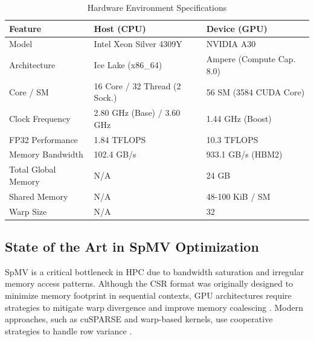 \documentclass[conference]{IEEEtran}
\begin{document}
\begin{table}[htbp]

\caption{Hardware Environment Specifications}

\label{tab:hardware}

\begin{center}

\footnotesize

\setlength{\tabcolsep}{3pt}

\begin{tabular}{|l|p{3.5cm}|p{3.5cm}|}

\hline

Feature & Host (CPU) & Device (GPU) \\

\hline

Model & Intel Xeon Silver 4309Y & NVIDIA A30 \\

Architecture & Ice Lake (x86\_64) & Ampere (Compute Cap. 8.0) \\

Core / SM & 16 Core / 32 Thread (2 Sock.) & 56 SM (3584 CUDA Core) \\

Clock Frequency & 2.80 GHz (Base) / 3.60 GHz & 1.44 GHz (Boost) \\

FP32 Performance & 1.84 TFLOPS & 10.3 TFLOPS \\

Memory Bandwidth & 102.4 GB/s & 933.1 GB/s (HBM2) \\

Total Global Memory & N/A & 24 GB \\

Shared Memory & N/A & 48-100 KiB / SM \\

Warp Size & N/A & 32 \\

\hline

\end{tabular}

\end{center}

\end{table}


\subsection{State of the Art in SpMV Optimization}

SpMV is a critical bottleneck in HPC due to bandwidth saturation and irregular memory access patterns. Although the CSR format was originally designed to minimize memory footprint in sequential contexts, GPU architectures require strategies to mitigate warp divergence and improve memory coalescing \cite{bChu2023}. Modern approaches, such as cuSPARSE and warp-based kernels, use cooperative strategies to handle row variance \cite{bBell2009}.
\end{document}

